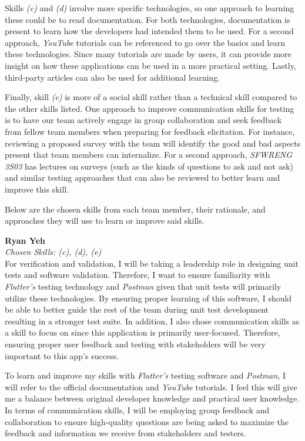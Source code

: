\documentclass[12pt, titlepage]{article}
\begin{document}
\begin{enumerate}
  Skills \textit{(c)} and \textit{(d)} involve more specific technologies, so one approach to learning these
  could be to read documentation. For both technologies, documentation is present to learn how the
  developers had intended them to be used. For a second approach, \textit{YouTube} tutorials can be referenced to
  go over the basics and learn these technologies. Since many tutorials are made by users, it
  can provide more insight on how these applications can be used in a more practical setting.
  Lastly, third-party articles can also be used for additional learning. \par

  Finally, skill \textit{(e)} is more of a social skill rather than a technical skill compared to the other skills listed.
  One approach to improve communication skills for testing is to have our team actively engage in group collaboration and seek feedback from fellow team members when preparing for feedback elicitation. For instance, reviewing a proposed survey with the team will identify the good and bad aspects present that team members can internalize. For a second approach, \textit{SFWRENG 3S03} has lectures on surveys
  (such as the kinds of questions to ask and not ask) and similar testing approaches that can also be reviewed to better
  learn and improve this skill.

  Below are the chosen skills from each team member, their rationale, and approaches they will use to learn or
  improve said skills.

  \textbf{Ryan Yeh}\\
  \textit{Chosen Skills: (c), (d), (e)} \\
  For verification and validation, I will be taking a leadership role in designing unit tests and software
  validation. Therefore, I want to ensure familiarity with \textit{Flutter's} testing technology and \textit{Postman}
  given that unit tests will primarily utilize these technologies. By ensuring proper learning of
  this software, I should be able to better guide the rest of the team during unit test development resulting
  in a stronger test suite. In addition, I also chose communication skills as a skill to focus on since this application
  is primarily user-focused. Therefore, ensuring proper user feedback and testing with stakeholders will be very important
  to this app's success. \par
  To learn and improve my skills with \textit{Flutter's} testing software and \textit{Postman}, I will refer to the
  official documentation and \textit{YouTube} tutorials. I feel this will give me a balance between original developer
  knowledge and practical user knowledge. In terms of communication skills, I will be employing group feedback
  and collaboration to ensure high-quality questions are being asked to maximize the feedback and information we receive
  from stakeholders and testers.


\end{enumerate}
\end{document}
